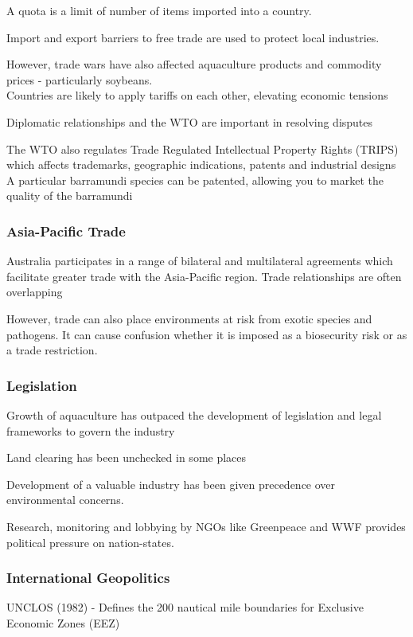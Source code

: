 				A quota is a limit of number of items imported into a country.

				Import and export barriers to free trade are used to protect local industries.

				However, trade wars have also affected aquaculture products and commodity prices - particularly soybeans. \\
					\; Countries are likely to apply tariffs on each other, elevating economic tensions

				Diplomatic relationships and the WTO are important in resolving disputes

				The WTO also regulates Trade Regulated Intellectual Property Rights (TRIPS) which affects trademarks, geographic indications, patents and industrial designs \\
				\; A particular barramundi species can be patented, allowing you to market the quality of the barramundi

			\subsubsection{Asia-Pacific Trade}
				Australia participates in a range of bilateral and multilateral agreements which facilitate greater trade with the Asia-Pacific region.
				Trade relationships are often overlapping

				However, trade can also place environments at risk from exotic species and pathogens. It can cause confusion whether it is imposed as a biosecurity risk or as a trade restriction.

			\subsubsection{Legislation}
				Growth of aquaculture has outpaced the development of legislation and legal frameworks to govern the industry

				Land clearing has been unchecked in some places

				Development of a valuable industry has been given precedence over environmental concerns.

				Research, monitoring and lobbying by NGOs like Greenpeace and WWF provides political pressure on nation-states.

			\subsubsection{International Geopolitics}
				UNCLOS (1982) - Defines the 200 nautical mile boundaries for Exclusive Economic Zones (EEZ)

